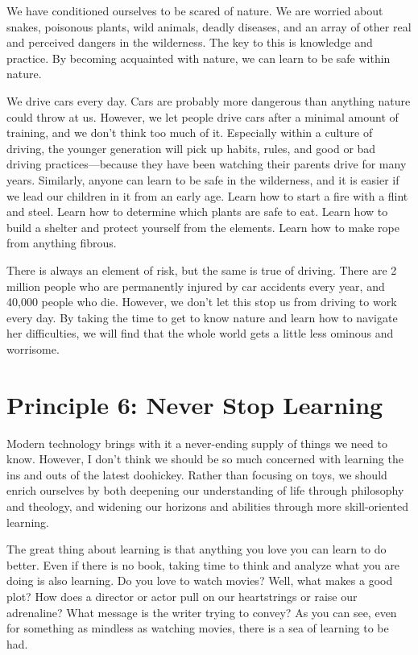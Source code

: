 We have conditioned ourselves to be scared of nature. We are worried
about snakes, poisonous plants, wild animals, deadly diseases, and an
array of other real and perceived dangers in the wilderness. The key to
this is knowledge and practice. By becoming acquainted with nature, we
can learn to be safe within nature. 

We drive cars every day. Cars are probably more dangerous than anything
nature could throw at us. However, we let people drive cars after a
minimal amount of training, and we
don't think too much of it. Especially
within a culture of driving, the younger
generation will pick up habits, rules, and good or bad driving
practices---because they have been watching their parents drive for many
years. Similarly, anyone can learn to be safe in the wilderness, and
it is easier if we lead our children in it from an early age. Learn how
to start a fire with a flint and steel. Learn how to determine which
plants are safe to eat. Learn how to build a shelter and protect
yourself from the elements. Learn how to make rope from anything
fibrous. 

There is always an element of risk, but the same is true of driving.
There are 2 million people who are permanently injured by car accidents
every year, and 40,000 people who die. However, we
don't let this stop us from driving to work every day.
By taking the time to get to know nature and learn how to navigate her
difficulties, we will find that the whole world gets a little less
ominous and worrisome. 

\section{Principle 6: Never Stop Learning}

Modern technology brings with it a never-ending supply of things we need
to know. However, I don't think we should be so much
concerned with learning the ins and outs of the latest doohickey.
Rather than focusing on toys, we should enrich ourselves by both
deepening our understanding of life through philosophy and theology,
and widening our horizons and abilities through more skill-oriented
learning.

The great thing about learning is that anything you love you can learn
to do better. Even if there is no book, taking time to think and
analyze what you are doing is also learning. Do you love to watch
movies? Well, what makes a good plot?  How does a director or actor
pull on our heartstrings or raise our adrenaline?  What message is the
writer trying to convey?  As you can see, even for something as
mindless as watching movies, there is a sea of learning to be had.

